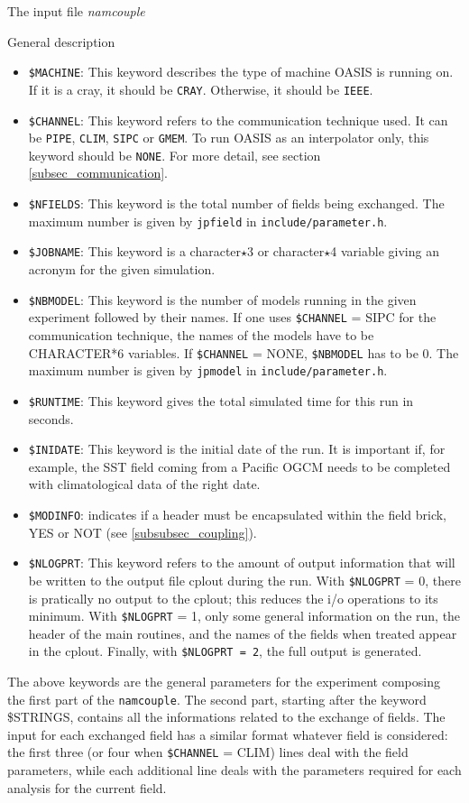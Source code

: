 \begin{subsection}{The input file {\it namcouple}}
\begin{subsubsection}{General description}
\begin{itemize}
\item {\tt \$MACHINE}: This keyword describes the type of machine OASIS is
running on. If it is a cray, it should be {\tt CRAY}. Otherwise, it should be
{\tt IEEE}.
\item {\tt \$CHANNEL}: This keyword refers to the communication technique
used. It can be {\tt PIPE}, {\tt CLIM}, {\tt SIPC} or {\tt GMEM}. To run OASIS as
an interpolator only, this keyword should be {\tt NONE}. For more
detail, see section \ref{subsec_communication}. 
\item {\tt \$NFIELDS}: This keyword is the total number of fields
being exchanged. The maximum number is given by {\tt jpfield} in 
{\tt include/parameter.h}.
\item {\tt \$JOBNAME}: This keyword is a character$\star$3 or
character$\star$4 variable
giving an acronym for the given simulation.
\item {\tt \$NBMODEL}: This keyword is the number of models running in the
given experiment followed by their names. If one uses {\tt \$CHANNEL}
= SIPC for the communication technique, the names of the models have to
be CHARACTER*6 variables. If {\tt \$CHANNEL} = 
NONE, {\tt \$NBMODEL} has to be 0.  The maximum number is given by 
{\tt jpmodel} in {\tt include/parameter.h}.
\item {\tt \$RUNTIME}: This keyword gives the total simulated time for this 
run in seconds.
\item {\tt \$INIDATE}: This keyword is the initial date of the run. It is 
important if, for example, the SST field coming from a Pacific OGCM 
needs to be completed with climatological data of the right date.
\item {\tt \$MODINFO}: indicates if a header must be encapsulated within 
the field brick, YES or NOT (see \ref{subsubsec_coupling}).
\item {\tt \$NLOGPRT}: This keyword refers to the amount of output 
information that will be written to the output file cplout during the
run. With  {\tt \$NLOGPRT} = 0, there is pratically no output to the
cplout; this reduces the i/o operations to its minimum.  With {\tt \$NLOGPRT}
= 1, only some general information on the run, the header of the main 
routines, and the names of the fields when treated appear in the cplout. 
Finally, with {\tt \$NLOGPRT = 2}, the full output is generated.

\end{itemize}

The above keywords are the general parameters for the experiment
composing the first part of the {\tt namcouple}. The second part,
starting after the keyword \$STRINGS,
contains all the informations related to the exchange of fields.
The input for each exchanged field has a similar format whatever field
is considered: the first three (or four when {\tt \$CHANNEL} = CLIM)
lines deal with the field parameters,
while each additional line deals with the parameters required for
each analysis for the current field. 


\end{subsubsection}
\end{subsection}
